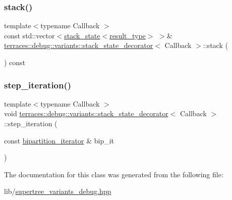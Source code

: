 \mbox{\label{classterraces_1_1debug_1_1variants_1_1stack__state__decorator_a371be3718c4eb307a46f313db17cfd18}} 
\subsubsection{\texorpdfstring{stack()}{stack()}}
{\footnotesize\ttfamily template$<$typename Callback $>$ \\
const std\+::vector$<$\hyperlink{structterraces_1_1debug_1_1variants_1_1stack__state}{stack\+\_\+state}$<$\hyperlink{classterraces_1_1debug_1_1variants_1_1stack__state__decorator_a01062643b31a3124c3e77d409f112785}{result\+\_\+type}$>$ $>$\& \hyperlink{classterraces_1_1debug_1_1variants_1_1stack__state__decorator}{terraces\+::debug\+::variants\+::stack\+\_\+state\+\_\+decorator}$<$ Callback $>$\+::stack (\begin{DoxyParamCaption}{ }\end{DoxyParamCaption}) const\hspace{0.3cm}{\ttfamily [inline]}}

\mbox{\label{classterraces_1_1debug_1_1variants_1_1stack__state__decorator_a1f93e11840c3fed2902f925a2fb10f5f}} 
\subsubsection{\texorpdfstring{step\+\_\+iteration()}{step\_iteration()}}
{\footnotesize\ttfamily template$<$typename Callback $>$ \\
void \hyperlink{classterraces_1_1debug_1_1variants_1_1stack__state__decorator}{terraces\+::debug\+::variants\+::stack\+\_\+state\+\_\+decorator}$<$ Callback $>$\+::step\+\_\+iteration (\begin{DoxyParamCaption}\item[{const \hyperlink{classterraces_1_1bipartition__iterator}{bipartition\+\_\+iterator} \&}]{bip\+\_\+it }\end{DoxyParamCaption})\hspace{0.3cm}{\ttfamily [inline]}}



The documentation for this class was generated from the following file\+:\begin{DoxyCompactItemize}
\item 
lib/\hyperlink{supertree__variants__debug_8hpp}{supertree\+\_\+variants\+\_\+debug.\+hpp}\end{DoxyCompactItemize}
